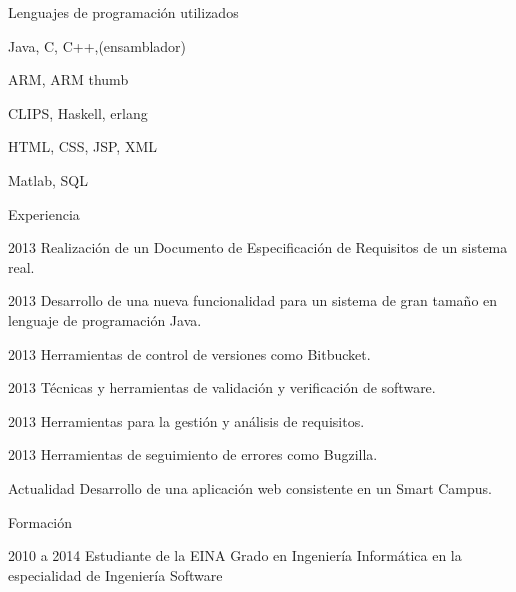 \begin{cv}{}
\vspace{2em}

\begin{cvlist}{Lenguajes de programación utilizados}
\item Java, C, C++,(ensamblador)
\item ARM, ARM thumb
\item CLIPS, Haskell, erlang
\item HTML, CSS, JSP, XML
\item Matlab, SQL
\end{cvlist}

\begin{cvlist}{Experiencia}

	\item[2013] Realización de un Documento de Especificación de Requisitos 
				de un sistema real.
	
	\item[2013] Desarrollo de una nueva funcionalidad para un sistema de gran 
				tama\~no en lenguaje de programación Java.
	
	\item[2013] Herramientas de control de versiones como Bitbucket.
	
	\item[2013] Técnicas y herramientas de validación y verificación de software.
	
	\item[2013] Herramientas para la gestión y análisis de requisitos.
	
	\item[2013] Herramientas de seguimiento de errores como Bugzilla.
	
	\item[Actualidad] Desarrollo de una aplicación web consistente en un Smart Campus.

\end{cvlist}

\begin{cvlist}{Formación}

	\item[2010 a 2014] Estudiante de la EINA
		Grado en Ingeniería Informática en la especialidad de Ingeniería Software


\end{cvlist}

\end{cv}